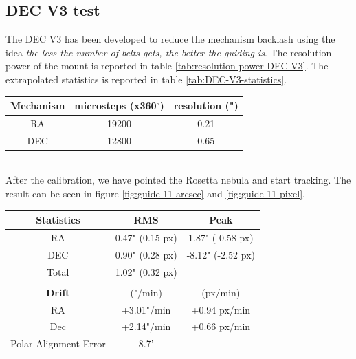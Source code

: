 \documentclass{article}
\begin{document}
\begin{multicols}{2}
        \subsection{DEC V3 test}
        The DEC V3 has been developed to reduce the mechanism backlash using the idea \textit{the less the number of belts gets, the better the guiding is}.
        The resolution power of the mount is reported in table \ref{tab:resolution-power-DEC-V3}.
        The extrapolated statistics is reported in table \ref{tab:DEC-V3-statistics}.
        \\
        \begin{minipage}
            {.5\textwidth}
            \begin{tabular}{ccc}
                Mechanism & microsteps (x360$^{\circ}$) & resolution (") \\
                \hline
                RA  & 19200 & 0.21\\ 
                DEC & 12800 & 0.65
            \end{tabular}
            \label{tab:resolution-power-DEC-V3}
        \end{minipage}
        \\
        After the calibration, we have pointed the Rosetta nebula and start tracking.
        The result can be seen in figure \ref{fig:guide-11-arcsec} and \ref{fig:guide-11-pixel}.
        \\
        \begin{minipage}{.4\textwidth}
            \centering
            \begin{tabular}{ccc}
                \textbf{Statistics}&RMS&Peak\\
                \hline
                RA& 0.47" (0.15 px)& 1.87" ( 0.58 px)\\
                DEC& 0.90" (0.28 px)&-8.12" (-2.52 px)\\
                Total& 1.02" (0.32 px)&\\
                \\
                \textbf{Drift}& ("/min) & (px/min)\\
                \hline
                RA& +3.01"/min& +0.94 px/min\\
                Dec& +2.14"/min& +0.66 px/min\\
                Polar Alignment Error& 8.7'&\\
                \hline
            \end{tabular}
            \label{tab:DEC-V3-statistics}
        \end{minipage}



\end{multicols}
\end{document}
